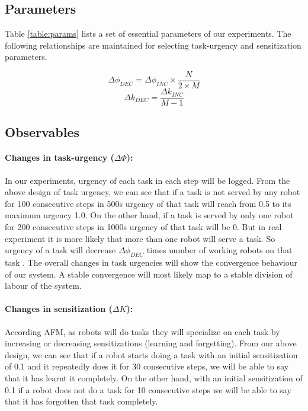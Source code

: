 \documentclass{llncs}
\begin{document}
\subsection{Parameters}
Table \ref{table:params} lists a set of essential parameters of our experiments. The following relationships are maintained for selecting task-urgency and sensitization parameters.
\begin{small}
\begin{equation}
\Delta\phi_{DEC} = \Delta\phi_{INC} \times \frac{N}{2 \times M}
\label{eqn:task-urgency}
\end{equation}
%
\begin{equation}
\Delta k_{DEC} = \frac{\Delta k_{INC}} {M - 1} 
\label{eqn:sensitization}
\end{equation}
\end{small}
%
\subsection{Observables}
\paragraph*{Changes in task-urgency ($\Delta \Phi$): }
In our experiments,  urgency of each task in each step will be logged. From the above design of task urgency, we can see that if a task is not served by any robot for 100 consecutive steps in 500s  urgency of that task will reach from 0.5 to its maximum urgency  1.0. On the other hand, if a task is served by only one robot for 200 consecutive steps in 1000s urgency of that task will be 0. But in real experiment it is more likely that more than one robot will serve a task. So urgency of a task will  decrease $\Delta\phi_{DEC}$ times number of working robots on that task \cite{Elsa}. The overall changes in task urgencies will show the convergence behaviour of our system. A stable convergence will most likely map to a stable division of labour of the system.
%
\paragraph*{Changes in sensitization ($\Delta K$): }
According AFM, as robots will do tasks they will specialize on each task by increasing or decreasing sensitizations (learning and forgetting).  From our above design, we can see that if a robot starts doing a task with an initial sensitization of 0.1 and it repeatedly does it for 30 consecutive steps, we will be able to say that it has learnt it completely. On the other hand,  with an initial sensitization of 0.1 if a robot does not do a task for 10 consecutive steps we will be able to say that it has forgotten that task completely.
%
\end{document}
